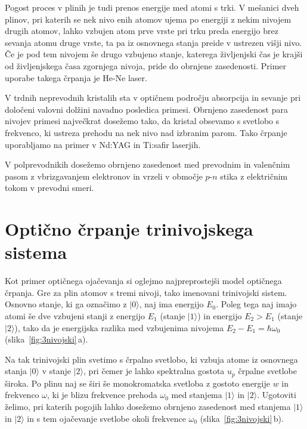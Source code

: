 Pogost proces v plinih je tudi prenos energije med atomi s trki. V
mešanici dveh plinov, pri katerih se nek nivo enih atomov ujema po energiji z
nekim nivojem drugih atomov, lahko vzbujen atom prve vrste pri trku preda 
energijo brez sevanja atomu druge vrste, ta pa iz osnovnega stanja preide v 
ustrezen višji nivo. Če je pod tem nivojem še drugo vzbujeno stanje, katerega
življenjski čas je krajši od življenjskega časa zgornjega nivoja, pride
do obrnjene zasedenosti. Primer uporabe takega črpanja je He-Ne laser.

V trdnih neprevodnih kristalih sta v optičnem področju absorpcija
in sevanje pri določeni valovni dolžini navadno posledica primesi.
Obrnjeno zasedenost para nivojev primesi največkrat dosežemo tako, da
kristal obsevamo s svetlobo s frekvenco, ki ustreza prehodu na nek
nivo nad izbranim parom. Tako črpanje uporabljamo na primer v Nd:YAG in Ti:safir 
laserjih.  

V polprevodnikih dosežemo obrnjeno zasedenost med 
prevodnim in valenčnim pasom z vbrizgavanjem elektronov in vrzeli v območje $p$-$n$ 
stika z električnim tokom v prevodni smeri. 

\section{Optično črpanje trinivojskega sistema}
Kot primer optičnega ojačevanja si oglejmo najpreprostejši model optičnega črpanja.
Gre za plin atomov s tremi nivoji, tako imenovani trinivojski sistem. Osnovno stanje, ki 
ga označimo z $|0\rangle$,  naj ima energijo $E_0$. Poleg tega naj imajo atomi še 
dve vzbujeni stanji z energijo $E_1$ (stanje $|1\rangle$) in energijo $E_2>E_1$
(stanje $|2\rangle$), tako da je energijska razlika med vzbujenima 
nivojema $E_2-E_1 = \hbar \omega_0$ (slika~\ref{fig:3nivojski}\,a).

Na tak trinivojski plin svetimo s črpalno svetlobo, ki vzbuja atome iz osnovnega stanja 
$|0\rangle$ v stanje $|2\rangle$, pri čemer je lahko spektralna gostota $u_{p}$ črpalne 
svetlobe široka. Po plinu naj se širi še monokromatska svetloba z gostoto 
energije $w$ in frekvenco $\omega$, ki je blizu frekvence prehoda $\omega_{0}$ med 
stanjema $|1\rangle$ in $|2\rangle$. 
Ugotoviti želimo, pri katerih pogojih lahko dosežemo obrnjeno zasedenost med 
stanjema $|1\rangle$ in $|2\rangle$ in s tem ojačevanje svetlobe okoli 
frekvence $\omega_{0}$ (slika~\ref{fig:3nivojski}\,b).

